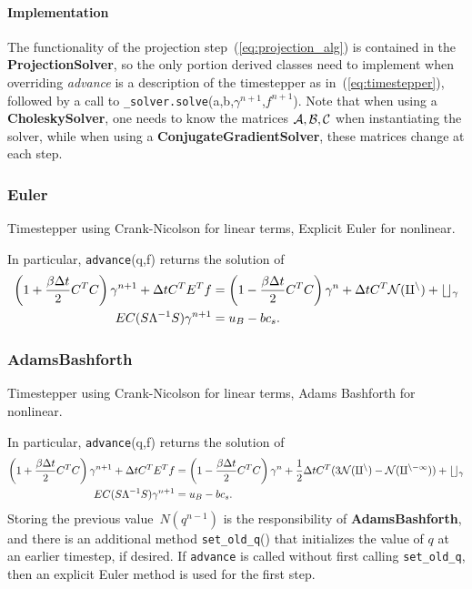 \documentclass[11pt]{article}
\def\class#1{{\bf #1}} %
\def\fn#1{{\tt #1}} %
\def\virtualfn#1{{\it #1}} %
\begin{document}
\paragraph{Implementation}
The functionality of the projection step~(\ref{eq:projection_alg}) is contained in the \class{ProjectionSolver}, so the only portion derived classes need to implement when overriding \virtualfn{advance} is a description of the timestepper as in~(\ref{eq:timestepper}), followed by a call to \fn{\_solver.solve}(a,b,$\gamma^{n+1}$,$f^{n+1}$).  Note that when using a \class{CholeskySolver}, one needs to know the matrices $\cal{A,B,C}$ when instantiating the solver, while when using a \class{ConjugateGradientSolver}, these matrices change at each step.

\subsubsection{Euler}
Timestepper using Crank-Nicolson for linear terms, Explicit Euler for nonlinear.

In particular, \fn{advance}(q,f) returns the solution of
	\begin{align}
		\left(1+\frac{\beta\Delta t}{2}C^TC\right)\gamma^{n+1} + \Delta t C^TE^Tf &= \left(1 - \frac{\beta\Delta t}{2}C^TC\right)\gamma^n + \Delta t C^T \cal{N}(q^n) + bc_\gamma \\
		EC(S\Lambda^{-1}S)\gamma^{n+1} &= u_B - bc_s.
	\end{align}

\subsubsection{AdamsBashforth}
Timestepper using Crank-Nicolson for linear terms, Adams Bashforth for nonlinear.

In particular, \fn{advance}(q,f) returns the solution of
	\begin{align}
		\left(1+\frac{\beta\Delta t}{2}C^TC\right)\gamma^{n+1} + \Delta t C^TE^Tf &= \left(1 - \frac{\beta\Delta t}{2}C^TC\right)\gamma^n + \frac{1}{2}\Delta t C^T (3\cal{N}(q^n)-\cal{N}(q^{n-1})) + bc_\gamma \\
		EC(S\Lambda^{-1}S)\gamma^{n+1} &= u_B - bc_s.
	\end{align}
Storing the previous value~$N(q^{n-1})$ is the responsibility of \class{AdamsBashforth}, and there is an additional method \fn{set\_old\_q}() that initializes the value of $q$ at an earlier timestep, if desired.  If \fn{advance} is called without first calling \fn{set\_old\_q}, then an explicit Euler method is used for the first step.
\end{document}
